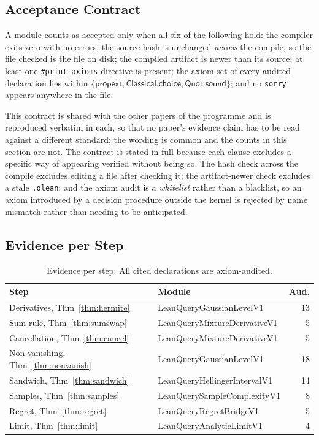 \documentclass[conference]{IEEEtran}
\theoremstyle{definition}
\newcommand{\lean}[1]{\textsf{\footnotesize #1}}
\begin{document}
\subsection{Acceptance Contract}

A module counts as accepted only when all six of the following hold: the compiler exits zero
with no errors; the source hash is unchanged \emph{across} the compile, so the file checked is
the file on disk; the compiled artifact is newer than its source; at least one
\texttt{\#print axioms} directive is present; the axiom set of every audited declaration lies
within $\{\textsf{propext},\textsf{Classical.choice},\textsf{Quot.sound}\}$; and no
\texttt{sorry} appears anywhere in the file.

This contract is shared with the other papers of the programme and is reproduced verbatim in
each, so that no paper's evidence claim has to be read against a different standard; the
wording is common and the counts in this section are not. The contract is stated in full
because each clause excludes a specific way of appearing verified without being so. The hash check across the compile excludes editing a file after
checking it; the artifact-newer check excludes a stale \texttt{.olean}; and the axiom audit is
a \emph{whitelist} rather than a blacklist, so an axiom introduced by a decision procedure
outside the kernel is rejected by name mismatch rather than needing to be anticipated.

\subsection{Evidence per Step}

\begin{table}[htbp]
\caption{Evidence per step. All cited declarations are axiom-audited.}
\label{tab:inventory}
\centering\footnotesize\setlength{\tabcolsep}{3pt}
\begin{tabular}{@{}llr@{}}
\toprule
Step & Module & Aud. \\
\midrule
Derivatives, Thm~\ref{thm:hermite}     & \lean{LeanQueryGaussianLevelV1}     & 13 \\
Sum rule, Thm~\ref{thm:sumswap}        & \lean{LeanQueryMixtureDerivativeV1} &  5 \\
Cancellation, Thm~\ref{thm:cancel}     & \lean{LeanQueryMixtureDerivativeV1} &  5 \\
Non-vanishing, Thm~\ref{thm:nonvanish} & \lean{LeanQueryGaussianLevelV1}     & 18 \\
Sandwich, Thm~\ref{thm:sandwich}       & \lean{LeanQueryHellingerIntervalV1} & 14 \\
Samples, Thm~\ref{thm:samples}         & \lean{LeanQuerySampleComplexityV1}  &  8 \\
Regret, Thm~\ref{thm:regret}           & \lean{LeanQueryRegretBridgeV1}      &  5 \\
Limit, Thm~\ref{thm:limit}             & \lean{LeanQueryAnalyticLimitV1}     &  4 \\
\bottomrule
\end{tabular}
\end{table}
\end{document}
